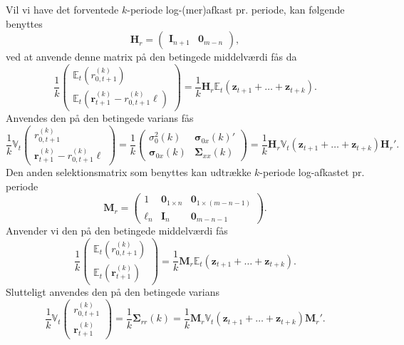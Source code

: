 \documentclass[
  a4paper,
  oneside]{memoir}
\begin{document}
Vil vi have det forventede \(k\)-periode log-(mer)afkast pr. periode, kan følgende benyttes
\begin{equation*}
        \bm{H}_r=\begin{pmatrix}\bm{I}_{n+1} & \bm{0}_{m-n}\end{pmatrix},
    \end{equation*}
ved at anvende denne matrix på den betingede middelværdi fås da
\begin{equation}
        \frac{1}{k}\begin{pmatrix}
        \mathbb{E}_t\left( r_{0,t+1}^{(k)} \right)\\
        \mathbb{E}_t\left( \bm{r}_{t+1}^{(k)}-r_{0,t+1}^{(k)}\bm{\bm{\ell}} \right)
        \end{pmatrix}=\frac{1}{k}\bm{H}_r\mathbb{E}_t(\bm{z}_{t+1}+\dots+\bm{z}_{t+k}).
    \end{equation}
Anvendes den på den betingede varians fås
\begin{equation}
        \frac{1}{k}\mathbb{V}_t\begin{pmatrix}
        r_{0,t+1}^{(k)}\\
        \bm{r}_{t+1}^{(k)}-r_{0,t+1}^{(k)}\bm{\bm{\ell}}
        \end{pmatrix}=\frac{1}{k}\begin{pmatrix}
        \sigma_0^2(k) & \bm{\sigma}_{0x}(k)'\\
        \bm{\sigma}_{0x}(k) & \bm{\Sigma}_{xx}(k)
        \end{pmatrix}=\frac{1}{k}\bm{H}_r\mathbb{V}_t(\bm{z}_{t+1}+\dots+\bm{z}_{t+k})\bm{H}_r'.
    \end{equation}
Den anden selektionsmatrix som benyttes kan udtrække \(k\)-periode log-afkastet pr. periode
\begin{equation}
        \bm{M}_r=\begin{pmatrix}
        1 & \bm{0}_{1\times n} & \bm{0}_{1\times (m-n-1)}\\
        \bm{\bm{\ell}}_n & \bm{I}_n & \bm{0}_{m-n-1}
        \end{pmatrix}.\label{eq:sel}
    \end{equation}
Anvender vi den på den betingede middelværdi fås
\begin{equation}
        \frac{1}{k}\begin{pmatrix}
        \mathbb{E}_t\left( r_{0,t+1}^{(k)} \right)\\
        \mathbb{E}_t\left( \bm{r}_{t+1}^{(k)} \right)
        \end{pmatrix}=\frac{1}{k}\bm{M}_r\mathbb{E}_t(\bm{z}_{t+1}+\dots+\bm{z}_{t+k}).
    \end{equation}
Slutteligt anvendes den på den betingede varians
\begin{equation}
        \frac{1}{k}\mathbb{V}_t\begin{pmatrix}
        r_{0,t+1}^{(k)}\\
        \bm{r}_{t+1}^{(k)}
        \end{pmatrix}=\frac{1}{k}\bm{\Sigma}_{rr}(k)=\frac{1}{k}\bm{M}_r\mathbb{V}_t(\bm{z}_{t+1}+\dots+\bm{z}_{t+k})\bm{M}_r'.\label{eq:bv}
    \end{equation}
\end{document}
